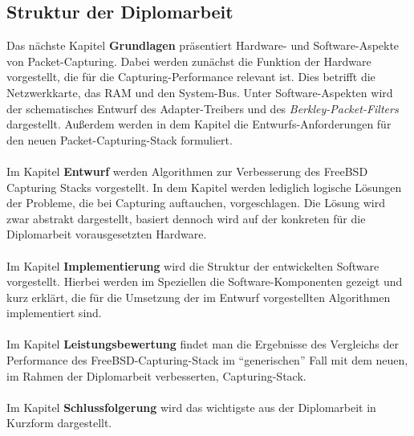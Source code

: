 {\subsection{Struktur der Diplomarbeit}
Das nächste Kapitel \textbf{Grundlagen} präsentiert Hardware- und
Software-Aspekte von Packet-Capturing. Dabei werden zunächst die Funktion der
Hardware vorgestellt, die für die Capturing-Performance relevant ist. Dies
betrifft die Netzwerkkarte, das RAM und den System-Bus.
Unter Software-Aspekten wird der schematisches
Entwurf des Adapter-Treibers und des \emph{Berkley-Packet-Filters} dargestellt.
Außerdem werden in dem Kapitel die Entwurfs-Anforderungen für den neuen
Packet-Capturing-Stack formuliert.\\\\
%
Im Kapitel \textbf{Entwurf} werden Algorithmen zur Verbesserung des FreeBSD
Capturing Stacks vorgestellt. In dem Kapitel werden lediglich logische Lösungen der
Probleme, die bei  Capturing auftauchen, vorgeschlagen. Die Lösung wird zwar
abstrakt dargestellt, basiert dennoch wird auf der konkreten für die Diplomarbeit
vorausgesetzten Hardware.\\\\
%
Im Kapitel \textbf{Implementierung} wird die Struktur der entwickelten Software
vorgestellt. Hierbei werden im Speziellen die Software-Komponenten gezeigt
und kurz erklärt, die für die Umsetzung der im Entwurf vorgestellten
Algorithmen implementiert sind.  \\\\
%
Im Kapitel \textbf{Leistungsbewertung} findet man die Ergebnisse  
des Vergleichs der Performance des FreeBSD-Capturing-Stack im ``generischen''
Fall mit dem neuen, im Rahmen der Diplomarbeit verbesserten, Capturing-Stack. \\\\
%
Im Kapitel \textbf{Schlussfolgerung} wird das wichtigste aus der Diplomarbeit 
in Kurzform dargestellt.  

}
